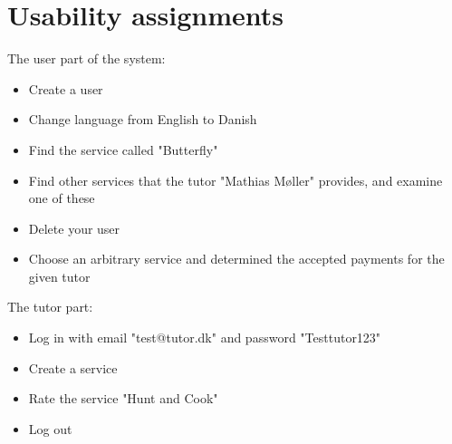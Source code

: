 \section{Usability assignments}\label{app:usability}
The user part of the system:
\begin{itemize}
    \item Create a user
    \item Change language from English to Danish
    \item Find the service called "Butterfly"
    \item Find other services that the tutor "Mathias Møller" provides, and examine one of these
    \item Delete your user
    \item Choose an arbitrary service and determined the accepted payments for the given tutor
\end{itemize}

The tutor part:
\begin{itemize}
    \item Log in with email "test@tutor.dk" and password "Testtutor123"
    \item Create a service
    \item Rate the service "Hunt and Cook"
    \item Log out
\end{itemize}
